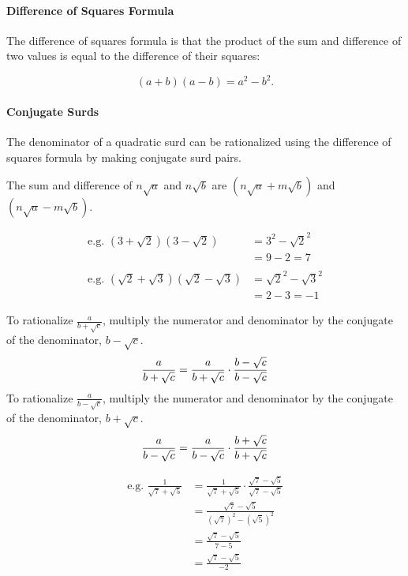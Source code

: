 \documentclass{article}
\begin{document}
\begin{enumerate}
\paragraph{Difference of Squares Formula}
The difference of squares formula is that the product of the sum and difference of two values is equal to the difference of their squares:

$$(a+b)(a-b)=a^2-b^2.$$

\paragraph{Conjugate Surds}
The denominator of a quadratic surd can be rationalized using the difference of squares formula by making conjugate surd pairs.

The sum and difference of $n\sqrt{a}$ and $n\sqrt{b}$ are $(n\sqrt{a}+m\sqrt{b})$ and $(n\sqrt{a}-m\sqrt{b})$.

\begin{align*}
\text{e.g. }(3+\sqrt{2})(3-\sqrt{2})
&=3^2-{\sqrt{2}}^2\\
&=9-2=7\\\\
\textrm{e.g. }(\sqrt{2}+\sqrt{3})(\sqrt{2}-\sqrt{3})
&={\sqrt{2}}^2-{\sqrt{3} }^2\\
&=2-3=-1
\end{align*}

To rationalize \large$\frac{a}{b+\sqrt{c}}$\normalsize, multiply the numerator and denominator by the conjugate of the denominator, $b-\sqrt{c}$.
$$\frac{a}{b+\sqrt{c}}=\frac{a}{b+\sqrt{c}}\\\cdot\frac{b-\sqrt{c}}{b-\sqrt{c}}$$
To rationalize \large$\frac{a}{b-\sqrt{c}}$\normalsize, multiply the numerator and denominator by the conjugate of the denominator, $b+\sqrt{c}$.
$$\frac{a}{b-\sqrt{c}}=\frac{a}{b-\sqrt{c}}\\\cdot\frac{b+\sqrt{c}}{b+\sqrt{c}}$$

\begin{equation*}
\begin{split}
\textrm{e.g. }
\frac{1}{\sqrt{7}+\sqrt{5}}
&=\frac{1}{\sqrt{7}+\sqrt{5}}
\cdot\frac{\sqrt{7}-\sqrt{5}}{\sqrt{7}-\sqrt{5}}\\
&=\frac{\sqrt{7}-\sqrt{5}}{(\sqrt{7})^2-(\sqrt{5})^2}\\
&=\frac{\sqrt{7}-\sqrt{5}}{7-5}\\
&=\frac{\sqrt{7}-\sqrt{5}}{-2}
\end{split}
\end{equation*}


\end{enumerate}
\end{document}
